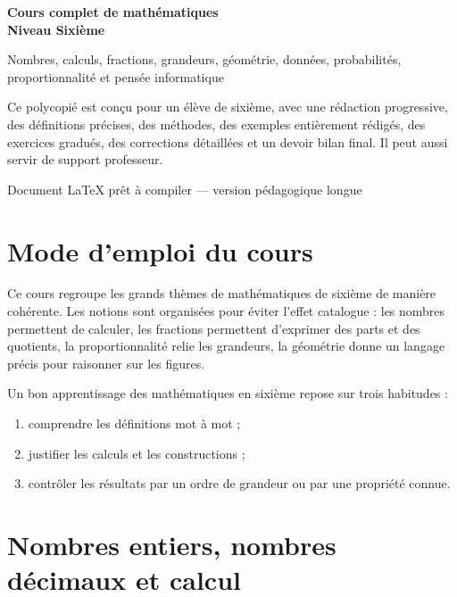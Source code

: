\documentclass[11pt,a4paper]{article}
\begin{document}
\begin{titlepage}
\centering
\vspace*{1cm}
{\Huge\bfseries Cours complet de mathématiques\\[0.2cm] Niveau Sixième}\par
\vspace{0.4cm}
{\Large Nombres, calculs, fractions, grandeurs, géométrie, données, probabilités, proportionnalité et pensée informatique}\par
\vspace{1cm}
\begin{tcolorbox}[colback=blue!3!white,colframe=bleu,width=0.9\textwidth]
Ce polycopié est conçu pour un élève de sixième, avec une rédaction progressive, des définitions précises, des méthodes, des exemples entièrement rédigés, des exercices gradués, des corrections détaillées et un devoir bilan final. Il peut aussi servir de support professeur.
\end{tcolorbox}
\vfill
{\large Document LaTeX prêt à compiler — version pédagogique longue}\par
\end{titlepage}

\tableofcontents
\newpage

\section*{Mode d'emploi du cours}
Ce cours regroupe les grands thèmes de mathématiques de sixième de manière cohérente. Les notions sont organisées pour éviter l'effet catalogue : les nombres permettent de calculer, les fractions permettent d'exprimer des parts et des quotients, la proportionnalité relie les grandeurs, la géométrie donne un langage précis pour raisonner sur les figures.

\begin{retenirbox}
Un bon apprentissage des mathématiques en sixième repose sur trois habitudes :
\begin{enumerate}[label=\arabic*)]
\item comprendre les définitions mot à mot ;
\item justifier les calculs et les constructions ;
\item contrôler les résultats par un ordre de grandeur ou par une propriété connue.
\end{enumerate}
\end{retenirbox}

\section{Nombres entiers, nombres décimaux et calcul}
\end{document}
